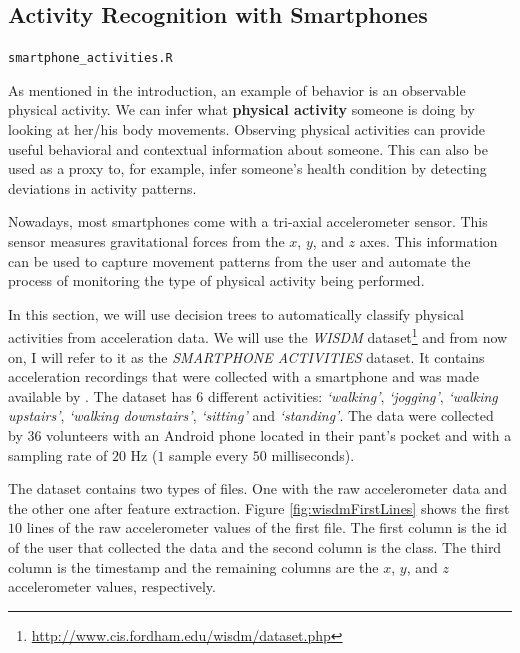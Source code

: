 \documentclass[
  11pt,
]{krantz}
\makeatletter
\newenvironment{kframe}{%
\medskip{}
\setlength{\fboxsep}{.8em}
 \def\at@end@of@kframe{}%
 \ifinner\ifhmode%
  \def\at@end@of@kframe{\end{minipage}}%
  \begin{minipage}{\columnwidth}%
 \fi\fi%
 \def\FrameCommand##1{\hskip\@totalleftmargin \hskip-\fboxsep
 \colorbox{shadecolor}{##1}\hskip-\fboxsep
     \hskip-\linewidth \hskip-\@totalleftmargin \hskip\columnwidth}%
 \MakeFramed {\advance\hsize-\width
   \@totalleftmargin\z@ \linewidth\hsize
   \@setminipage}}%
 {\par\unskip\endMakeFramed%
 \at@end@of@kframe}
\newenvironment{rmdblock}[1]
  {
  \begin{itemize}
  \renewcommand{\labelitemi}{
    \raisebox{-.7\height}[0pt][0pt]{
      {\setkeys{Gin}{width=3em,keepaspectratio}\texttt{[image: images/icons/\#1]}}
    }
  }
  \setlength{\fboxsep}{1em}
  \begin{kframe}
  \item
  }
  {
  \end{kframe}
  \end{itemize}
  }
\newenvironment{rmdfolder}
  {\begin{rmdblock}{folder}}
  {\end{rmdblock}}
\makeatother
\begin{document}
\hypertarget{activityRecognition}{%
\subsection{Activity Recognition with Smartphones}\label{activityRecognition}}

\begin{rmdfolder}
\texttt{smartphone\_activities.R}
\end{rmdfolder}

As mentioned in the introduction, an example of behavior is an observable physical activity. We can infer what \textbf{physical activity} someone is doing by looking at her/his body movements. Observing physical activities can provide useful behavioral and contextual information about someone. This can also be used as a proxy to, for example, infer someone's health condition by detecting deviations in activity patterns.

Nowadays, most smartphones come with a tri-axial accelerometer sensor. This sensor measures gravitational forces from the \(x\), \(y\), and \(z\) axes. This information can be used to capture movement patterns from the user and automate the process of monitoring the type of physical activity being performed.

In this section, we will use decision trees to automatically classify physical activities from acceleration data. We will use the \emph{WISDM} dataset\footnote{\url{http://www.cis.fordham.edu/wisdm/dataset.php}} and from now on, I will refer to it as the \emph{SMARTPHONE ACTIVITIES} dataset. It contains acceleration recordings that were collected with a smartphone and was made available by \citet{kwapisz2010}. The dataset has \(6\) different activities: \emph{`walking'}, \emph{`jogging'}, \emph{`walking upstairs'}, \emph{`walking downstairs'}, \emph{`sitting'} and \emph{`standing'}. The data were collected by \(36\) volunteers with an Android phone located in their pant's pocket and with a sampling rate of \(20\) Hz (\(1\) sample every \(50\) milliseconds).

The dataset contains two types of files. One with the raw accelerometer data and the other one after feature extraction. Figure \ref{fig:wisdmFirstLines} shows the first \(10\) lines of the raw accelerometer values of the first file. The first column is the id of the user that collected the data and the second column is the class. The third column is the timestamp and the remaining columns are the \(x\), \(y\), and \(z\) accelerometer values, respectively.
\end{document}
